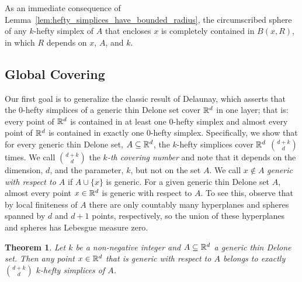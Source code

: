 \documentclass[10pt,a4paper]{article}
\newtheorem{theorem}{Theorem}[section]
\newcommand {\mm}[1] {\ifmmode{#1}\else{\mbox{\(#1\)}}\fi}
\theoremstyle{plain}
\newcommand{\Rspace}        {\mm{{\mathbb R}}}
\begin{document}
As an immediate consequence of Lemma~\ref{lem:hefty_simplices_have_bounded_radius}, the circumscribed sphere of any $k$-hefty simplex of $A$ that encloses $x$ is completely contained in $B(x,R)$, in which $R$ depends on $x$, $A$, and $k$.
\subsection{Global Covering}
\label{sec:2.2}
Our first goal is to generalize the classic result of Delaunay, which asserts that the $0$-hefty simplices of a generic thin Delone set cover $\Rspace^d$ in one layer; that is: every point of $\Rspace^d$ is contained in at least one $0$-hefty simplex and almost every point of $\Rspace^d$ is contained in exactly one $0$-hefty simplex.
Specifically, we show that for every generic thin Delone set, $A \subseteq \Rspace^d$, the $k$-hefty simplices cover $\Rspace^d$ $\binom{d+k}{d}$ times.
We call $\binom{d+k}{d}$ the \emph{$k$-th covering number} and note that it depends on the dimension, $d$, and the parameter, $k$, but not on the set $A$.
We call $x \notin A$ \emph{generic with respect to $A$} if $A \cup \{x\}$ is generic.
For a given generic thin Delone set $A$, almost every point $x \in \Rspace^d$ is generic with respect to $A$.
To see this, observe that by local finiteness of $A$ there are only countably many hyperplanes and spheres spanned by $d$ and $d+1$ points, respectively, so the union of these hyperplanes and spheres has Lebesgue measure zero.
\begin{theorem}
  \label{thm:global_covering}
  Let $k$ be a non-negative integer and $A \subseteq \Rspace^d$ a generic thin Delone set.
  Then any point $x \in \Rspace^d$ that is generic with respect to $A$ belongs to exactly $\binom{d+k}{d}$ $k$-hefty simplices of $A$.
\end{theorem}
\end{document}
